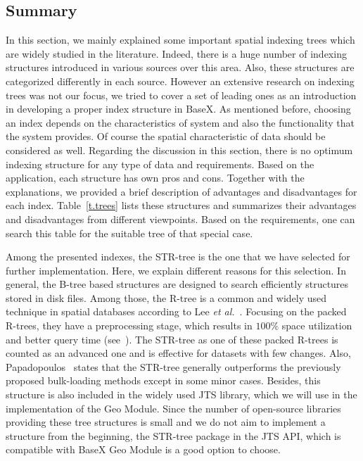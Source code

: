 \documentclass[a4paper,12pt]{article}
\begin{document}
\subsection{Summary}
\label{indexsummary}
In this section, we mainly explained some important spatial indexing trees which are widely studied in the literature. Indeed, there is a huge number of indexing structures introduced in various sources over this area. Also, these structures are categorized differently in each source. However an extensive research on indexing trees was not our focus, we tried to cover a set of leading ones as an introduction in developing a proper index structure in BaseX. As mentioned before, choosing an index depends on the characteristics of system and also the functionality that the system provides. Of course the spatial characteristic of data should be considered as well. 
Regarding the discussion in this section, there is no optimum indexing structure for any type of data and requirements. Based on the application, each structure has own pros and cons. Together with the explanations, we provided a brief description of advantages and disadvantages for each index. %
Table~\ref{t.trees} lists these structures and summarizes their advantages and disadvantages from different viewpoints. 
Based on the requirements, one can search this table for the suitable tree of that special case.

Among the presented indexes, the STR-tree is the one that we have selected for further implementation.
Here, we explain different reasons for this selection.
In general, the B-tree based structures are designed to search efficiently structures stored in disk files.
Among those, the R-tree is a common and widely used technique in spatial databases according to Lee \emph{et al.}~\cite{Lee}.
Focusing on the packed R-trees,
they have a preprocessing stage, which results in
$100\%$ space utilization and better query time (see~\cite{Lee}).
The STR-tree as one of these packed R-trees is counted as an advanced one 
and is effective for datasets with few changes.
Also, Papadopoulos~\cite{Papadopoulos2010} states that the STR-tree generally outperforms
the previously proposed bulk-loading methods except in some minor cases.
Besides, this structure is also included in the widely used JTS library,
which we will use in the implementation of the Geo Module.  
Since the number of open-source libraries providing these tree structures is small 
and we do not aim to implement a structure from the beginning, 
the STR-tree package in the JTS API, which is compatible 
with BaseX Geo Module is a good option to choose.
\end{document}
